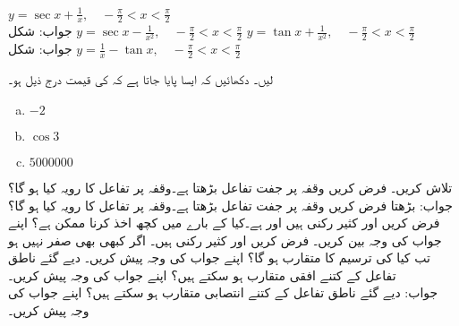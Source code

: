 $y=\sec x+\tfrac{1}{x},\quad -\tfrac{\pi}{2}<x<\tfrac{\pi}{2}$\\
جواب:\quad
شکل 
$y=\sec x-\tfrac{1}{x^2},\quad -\tfrac{\pi}{2}<x<\tfrac{\pi}{2}$
$y=\tan x+\tfrac{1}{x^2},\quad -\tfrac{\pi}{2}<x<\tfrac{\pi}{2}$\\
جواب:\quad
شکل 
$y=\tfrac{1}{x}-\tan x,\quad -\tfrac{\pi}{2}<x<\tfrac{\pi}{2}$

 لیں۔ دکھائیں کہ ایسا  پایا جاتا ہے کہ  کی قیمت درج ذیل ہو۔ 
\begin{multicols}{3}
\begin{enumerate}[a.]
\item
$-2$
\item
$\cos 3$
\item
$\num{5000000}$
\end{enumerate}
\end{multicols}
 تلاش کریں۔
\quad
فرض کریں وقفہ  پر جفت تفاعل بڑھتا ہے۔وقفہ  پر تفاعل کا رویہ کیا ہو گا؟\\
جواب:\quad
بڑھتا
\quad
فرض کریں وقفہ  پر جفت تفاعل بڑھتا ہے۔وقفہ  پر تفاعل کا رویہ کیا ہو گا؟
فرض کریں  اور  کثیر رکنی ہیں اور  ہے۔کیا 
 کے بارے میں کچھ اخذ کرنا ممکن ہے؟ اپنے جواب کی وجہ بین کریں۔
فرض کریں  اور  کثیر رکنی ہیں۔ اگر  کبھی بھی صفر نہیں ہو تب کیا  کی ترسیم کا متقارب ہو گا؟ اپنے جواب کی وجہ پیش کریں۔
دیے گئے ناطق تفاعل کے  کتنے افقی متقارب ہو سکتے ہیں؟ اپنے جواب کی وجہ پیش کریں۔\\
جواب:\quad
{}
دیے گئے ناطق تفاعل کے  کتنے انتصابی متقارب ہو سکتے ہیں؟ اپنے جواب کی وجہ پیش کریں۔
